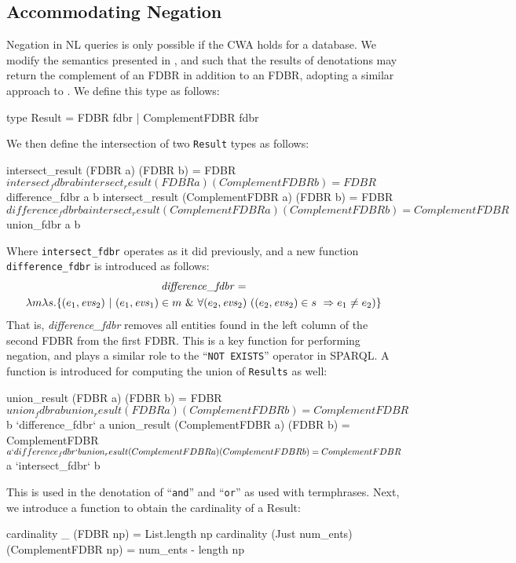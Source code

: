 \documentclass[../main.tex]{subfiles}
\begin{document}
\begin{refsection}
\section{Accommodating Negation}
\label{webist2020conf:negation}
\noindent Negation in NL queries is only possible if the CWA holds for a database.  We modify
the semantics presented in \cite{frostpeelar2019}, \cite{frost2018extensible} and \cite{peelar2020compositional} such that the results of denotations may return the complement of an FDBR in addition to an FDBR, adopting a similar approach to \cite{frostboulos2002}.  We define this type as follows:
\begin{code}
    type Result = FDBR fdbr | ComplementFDBR fdbr
\end{code}
We then define the intersection of two \texttt{Result} types as follows:
\begin{code}
    intersect_result (FDBR a) (FDBR b)
      = FDBR $ intersect_fdbr a b
    intersect_result (FDBR a) (ComplementFDBR b)
      = FDBR $ difference_fdbr a b
    intersect_result (ComplementFDBR a) (FDBR b)
      = FDBR $ difference_fdbr b a
    intersect_result (ComplementFDBR a) (ComplementFDBR b)
      = ComplementFDBR $ union_fdbr a b
\end{code}
Where \texttt{intersect\_fdbr} operates as it did previously, and a new function \linebreak \texttt{difference\_fdbr} is introduced as follows:
\begin{multline*}
\opit{difference\_fdbr} = \\ \lambda m \lambda s.\{(e_1,\evs_2)\ |\ (e_1,\evs_1) \in m\ \&\ \forall(e_2, \evs_2)\ ((e_2,\evs_2) \in s\ \Rightarrow e_1 \neq e_2)\}
\end{multline*}
That is, \textit{difference\_fdbr} removes all entities found in the left column of the second FDBR from the first FDBR.  This is a key function for performing negation, and plays a similar role to the ``\texttt{NOT EXISTS}'' operator in SPARQL.  A function is introduced for computing the union of \texttt{Results} as well:
\begin{code}
    union_result (FDBR a) (FDBR b)
      = FDBR $ union_fdbr a b
    union_result (FDBR a) (ComplementFDBR b)
      = ComplementFDBR $ b `difference_fdbr` a
    union_result (ComplementFDBR a) (FDBR b)
      = ComplementFDBR $ a `difference_fdbr` b
    union_result (ComplementFDBR a) (ComplementFDBR b)
      = ComplementFDBR $ a `intersect_fdbr` b
\end{code}
This is used in the denotation of ``\texttt{and}'' and ``\texttt{or}'' as used with termphrases.
Next, we introduce a function to obtain the cardinality of a Result:
\begin{code}
    cardinality _ (FDBR np) = List.length np
    cardinality (Just num_ents) (ComplementFDBR np)
    = num_ents - length np
\end{code}


\end{refsection}
\end{document}
